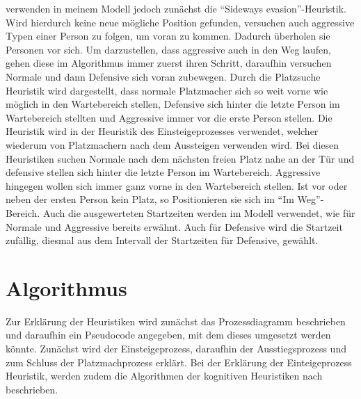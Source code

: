 verwenden in meinem Modell jedoch zunächst die "`Sideways evasion"'-Heuristik. Wird hierdurch keine neue mögliche Position gefunden, versuchen auch aggressive Typen einer Person zu folgen, um voran zu kommen. Dadurch überholen sie Personen vor sich. Um darzustellen, dass aggressive auch in den Weg laufen, gehen diese im Algorithmus immer zuerst ihren Schritt, daraufhin versuchen Normale und dann Defensive sich voran zubewegen. Durch die Platzsuche Heuristik wird dargestellt, dass normale Platzmacher sich so weit vorne wie möglich in den Wartebereich stellen, Defensive sich hinter die letzte Person im Wartebereich stellten und Aggressive immer vor die erste Person stellen. Die Heuristik wird in der Heuristik des Einsteigeprozesses verwendet, welcher wiederum von Platzmachern nach dem Aussteigen verwenden wird. Bei diesen Heuristiken suchen Normale nach dem nächsten freien Platz nahe an der Tür und defensive stellen sich hinter die letzte Person im Wartebereich. Aggressive hingegen wollen sich immer ganz vorne in den Wartebereich stellen. Ist vor oder neben der ersten Person kein Platz, so Positionieren sie sich im "`Im Weg"'-Bereich. Auch die ausgewerteten Startzeiten werden im Modell verwendet, wie für Normale und Aggressive bereits erwähnt. Auch für Defensive wird die Startzeit zufällig, diesmal aus dem Intervall der Startzeiten für Defensive, gewählt.
\section{Algorithmus} \label{Algorithmus}
Zur Erklärung der Heuristiken wird zunächst das Prozessdiagramm beschrieben und daraufhin ein Pseudocode angegeben, mit dem dieses umgesetzt werden könnte. Zunächst wird der Einsteigeprozess, daraufhin der Ausstiegsprozess und zum Schluss der Platzmachprozess erklärt. Bei der Erklärung der Einteigeprozess Heuristik, werden zudem die Algorithmen der kognitiven Heuristiken nach \cite{Seitz.2016} beschrieben.
